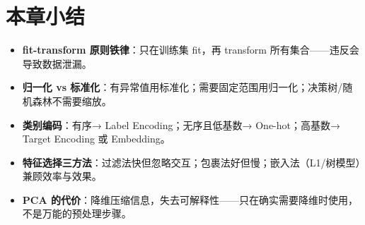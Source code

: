 \documentclass[a4paper,11pt]{ctexart}
\begin{document}
\section{本章小结}
\begin{itemize}
    \item \textbf{fit-transform 原则铁律}：只在训练集 fit，再 transform 所有集合——违反会导致数据泄漏。
    \item \textbf{归一化 vs 标准化}：有异常值用标准化；需要固定范围用归一化；决策树/随机森林不需要缩放。
    \item \textbf{类别编码}：有序→ Label Encoding；无序且低基数→ One-hot；高基数→ Target Encoding 或 Embedding。
    \item \textbf{特征选择三方法}：过滤法快但忽略交互；包裹法好但慢；嵌入法（L1/树模型）兼顾效率与效果。
    \item \textbf{PCA 的代价}：降维压缩信息，失去可解释性——只在确实需要降维时使用，不是万能的预处理步骤。
\end{itemize}
\end{document}
